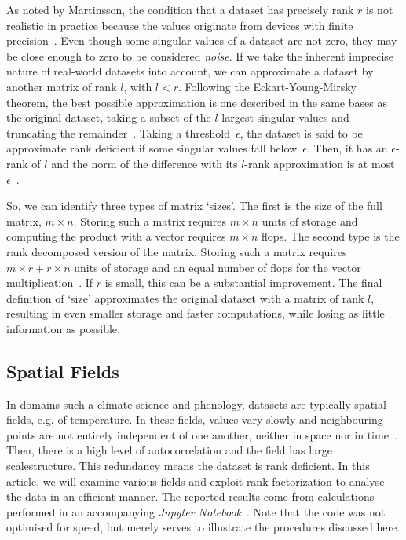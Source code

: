 \documentclass{acm_proc_article-sp}
\begin{document}
As noted by Martinsson, the condition that a dataset has precisely rank $r$ is not realistic in practice because the values originate from devices with finite precision~\cite{Martinsson2016}. Even though some singular values of a dataset are not zero, they may be close enough to zero to be considered \textit{noise}. If we take the inherent imprecise nature of real-world datasets into account, we can approximate a dataset by another matrix of rank $l$, with $l < r$. Following the Eckart-Young-Mirsky theorem, the best possible approximation is one described in the same bases as the original dataset, taking a subset of the $l$ largest singular values and truncating the remainder~\cite{Eckart1936}. Taking a threshold~$\epsilon$, the dataset is said to be approximate rank deficient if some singular values fall below~$\epsilon$. Then, it has an $\epsilon$-rank of $l$ and the norm of the difference with its $l$-rank approximation is at most~$\epsilon$~\cite{Martinsson2016}.

So, we can identify three types of matrix `sizes'. The first is the size of the full matrix, $m \times n$. Storing such a matrix requires $m \times n$ units of storage and computing the product with a vector requires $m \times n$ flops. The second type is the rank decomposed version of the matrix. Storing such a matrix requires $m \times r + r \times n$ units of storage and an equal number of flops for the vector multiplication~\cite{Martinsson2016}. If $r$ is small, this can be a substantial improvement. The final definition of `size' approximates the original dataset with a matrix of rank $l$, resulting in even smaller storage and faster computations, while losing as little information as possible.

\subsection{Spatial Fields}
\label{sec:Introduction Spatial Fields}

In domains such a climate science and phenology, datasets are typically spatial fields, e.g. of temperature. In these fields, values vary slowly and neighbouring points are not entirely independent of one another, neither in space nor in time~\cite{Eshel2011}. Then, there is a high level of autocorrelation and the field has large scalestructure. This redundancy means the dataset is rank deficient. In this article, we will examine various fields and exploit rank factorization to analyse the data in an efficient manner. The reported results come from calculations performed in an accompanying \textit{Jupyter Notebook}~\cite{Bogaardt2018}. Note that the code was not optimised for speed, but merely serves to illustrate the procedures discussed here.
\end{document}
